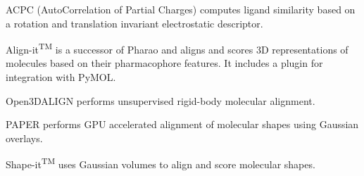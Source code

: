 ACPC (AutoCorrelation of Partial Charges) \cite{Berenger_2014} computes ligand similarity based on a rotation and translation invariant electrostatic descriptor.

Align-it\textsuperscript{TM} is a successor of Pharao \cite{Taminau_2008} and aligns and scores 3D representations of molecules based on their pharmacophore features.  It includes a plugin for integration with PyMOL.

Open3DALIGN \cite{Tosco_2011} performs unsupervised rigid-body molecular alignment.

PAPER \cite{Haque_2010} performs GPU accelerated alignment of molecular shapes using Gaussian overlays.

Shape-it\textsuperscript{TM} uses Gaussian volumes to align and score molecular shapes.


